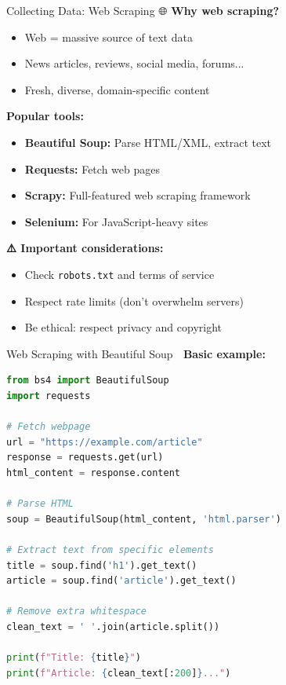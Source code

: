 \documentclass[aspectratio=169]{beamer}
\begin{document}
\begin{frame}[shrink=10]{Collecting Data: Web Scraping 🌐}
    \textbf{Why web scraping?}
    \begin{itemize}\setlength{\itemsep}{0pt}
        \item Web = massive source of text data
        \item News articles, reviews, social media, forums...
        \item Fresh, diverse, domain-specific content
    \end{itemize}

    \vspace{0.5em}
    \textbf{Popular tools:}
    \begin{itemize}\setlength{\itemsep}{0pt}
        \item \textbf{Beautiful Soup:} Parse HTML/XML, extract text
        \item \textbf{Requests:} Fetch web pages
        \item \textbf{Scrapy:} Full-featured web scraping framework
        \item \textbf{Selenium:} For JavaScript-heavy sites
    \end{itemize}

    \vspace{0.5em}
    \textbf{⚠️ Important considerations:}
    \begin{itemize}\setlength{\itemsep}{0pt}
        \item Check \texttt{robots.txt} and terms of service
        \item Respect rate limits (don't overwhelm servers)
        \item Be ethical: respect privacy and copyright
    \end{itemize}
\end{frame}

\begin{frame}[fragile]{Web Scraping with Beautiful Soup 🍜}
    \textbf{Basic example:}

    \begin{lstlisting}[language=Python]
from bs4 import BeautifulSoup
import requests

# Fetch webpage
url = "https://example.com/article"
response = requests.get(url)
html_content = response.content

# Parse HTML
soup = BeautifulSoup(html_content, 'html.parser')

# Extract text from specific elements
title = soup.find('h1').get_text()
article = soup.find('article').get_text()

# Remove extra whitespace
clean_text = ' '.join(article.split())

print(f"Title: {title}")
print(f"Article: {clean_text[:200]}...")
    \end{lstlisting}
\end{frame}
\end{document}
